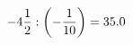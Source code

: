 \documentclass[preview]{standalone}
\begin{document}
\begin{align*}
-4 { 1 \over 2 }  :  \left( - { 1 \over 10 } \right) = 35.0
\end{align*}
\end{document}
